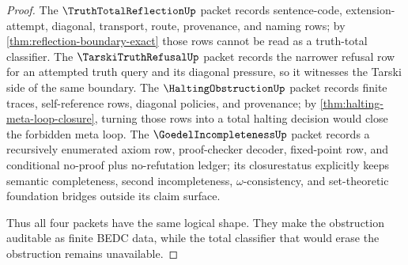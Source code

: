 \begin{proof}
The $\TruthTotalReflectionUp$ packet records sentence-code, extension-attempt, diagonal, transport, route, provenance, and naming rows; by \autoref{thm:reflection-boundary-exact} those rows cannot be read as a truth-total classifier. The $\TarskiTruthRefusalUp$ packet records the narrower refusal row for an attempted truth query and its diagonal pressure, so it witnesses the Tarski side of the same boundary. The $\HaltingObstructionUp$ packet records finite traces, self-reference rows, diagonal policies, and provenance; by \autoref{thm:halting-meta-loop-closure}, turning those rows into a total halting decision would close the forbidden meta loop. The $\GoedelIncompletenessUp$ packet records a recursively enumerated axiom row, proof-checker decoder, fixed-point row, and conditional no-proof plus no-refutation ledger; its closurestatus explicitly keeps semantic completeness, second incompleteness, $\omega$-consistency, and set-theoretic foundation bridges outside its claim surface.

Thus all four packets have the same logical shape. They make the obstruction auditable as finite BEDC data, while the total classifier that would erase the obstruction remains unavailable.
\end{proof}

